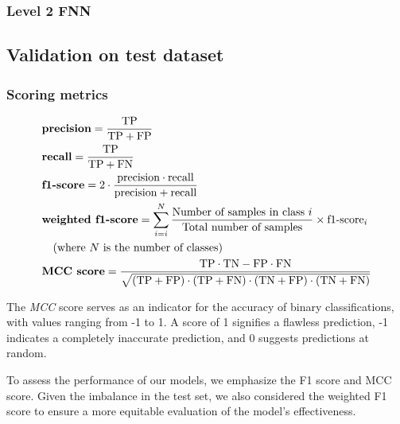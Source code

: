 \documentclass{bioinfo}
\begin{document}
\begin{methods}
\subsubsection{Level 2 FNN}


\subsection{Validation on test dataset}

\subsubsection{Scoring metrics}



\begin{align}
	&\textbf{precision} = \frac{\text{TP}}{\text{TP} + \text{FP}} \\
    &\textbf{recall} = \frac{\text{TP}}{\text{TP} + \text{FN}} \\
    &\textbf{f1-score} = 2 \cdot \frac{\text{precision} \cdot \text{recall}}{\text{precision} + \text{recall}} \\
	& \textbf{weighted f1-score} = \operatornamewithlimits{\sum}^{N}_{i=i} \frac{\text{Number of samples in class }i}{\text{Total number of samples}}  \times \text{f1-score}_{i}\nonumber\\
	&\quad \text{(where $N$ is the number of classes)} \\
    &\textbf{MCC score} = \frac{\text{TP} \cdot \text{TN} - \text{FP} \cdot \text{FN}}{\sqrt{(\text{TP} + \text{FP}) \cdot (\text{TP} + \text{FN}) \cdot (\text{TN} + \text{FP}) \cdot (\text{TN} + \text{FN})}}
\end{align}

The \textit{MCC} score serves as an indicator for the accuracy of binary classifications, with values ranging from -1 to 1. A score of 1 signifies a flawless prediction, 
-1 indicates a completely inaccurate prediction, and 0 suggests predictions at random.  

To assess the performance of our models, we emphasize the F1 score and MCC score. 
Given the imbalance in the test set, we also considered the weighted F1 score to ensure a more equitable evaluation of the model's 
effectiveness.

\end{methods}
\end{document}
